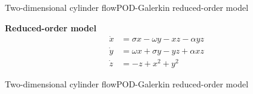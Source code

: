 \documentclass[usenames,dvipsnames,svgnames,10pt,aspectratio=169]{beamer}
\begin{document}
\begin{frame}[t, c]{Two-dimensional cylinder flow}{POD-Galerkin reduced-order model}
  \centering
  \begin{tcolorbox}[colback=white, colframe=beamer@kthblue]
    \centering
    \textbf{Reduced-order model}
    \[
    \begin{aligned}
      \dot{x} & = \sigma x - \omega y - xz - \alpha yz \\
      \dot{y} & = \omega x + \sigma y - yz + \alpha xz \\
      \dot{z} & = -z + x^2 + y^2
    \end{aligned}
    \]
  \end{tcolorbox}
\end{frame}




\begin{frame}[t, c]{Two-dimensional cylinder flow}{POD-Galerkin reduced-order model}
  
\end{frame}
\end{document}
